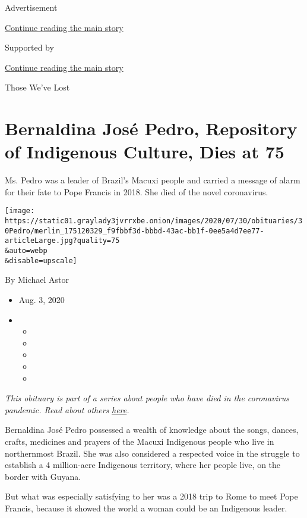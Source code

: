 Advertisement

\protect\hyperlink{after-top}{Continue reading the main story}

Supported by

\protect\hyperlink{after-sponsor}{Continue reading the main story}

Those We've Lost

\hypertarget{bernaldina-josuxe9-pedro-repository-of-indigenous-culture-dies-at-75}{%
\section{Bernaldina José Pedro, Repository of Indigenous Culture, Dies
at
75}\label{bernaldina-josuxe9-pedro-repository-of-indigenous-culture-dies-at-75}}

Ms. Pedro was a leader of Brazil's Macuxi people and carried a message
of alarm for their fate to Pope Francis in 2018. She died of the novel
coronavirus.

\texttt{[image: https://static01.graylady3jvrrxbe.onion/images/2020/07/30/obituaries/30Pedro/merlin\_175120329\_f9fbbf3d-bbbd-43ac-bb1f-0ee5a4d7ee77-articleLarge.jpg?quality=75\\\&auto=webp\\\&disable=upscale]}

By Michael Astor

\begin{itemize}
\item
  Aug. 3, 2020
\item
  \begin{itemize}
  \item
  \item
  \item
  \item
  \item
  \end{itemize}
\end{itemize}

\emph{This obituary is part of a series about people who have died in
the coronavirus pandemic. Read about others}
\href{https://www.nytimes3xbfgragh.onion/interactive/2020/obituaries/people-died-coronavirus-obituaries.html}{\emph{here}}\emph{.}

Bernaldina José Pedro possessed a wealth of knowledge about the songs,
dances, crafts, medicines and prayers of the Macuxi Indigenous people
who live in northernmost Brazil. She was also considered a respected
voice in the struggle to establish a 4 million-acre Indigenous
territory, where her people live, on the border with Guyana.

But what was especially satisfying to her was a 2018 trip to Rome to
meet Pope Francis, because it showed the world a woman could be an
Indigenous leader.

